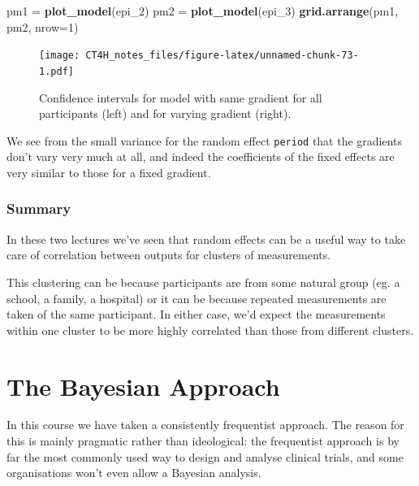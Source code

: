\documentclass[
  openany]{book}
\newenvironment{Shaded}{\begin{snugshade}}{\end{snugshade}}
\newcommand{\AttributeTok}[1]{\textcolor[rgb]{0.13,0.29,0.53}{#1}}
\newcommand{\DecValTok}[1]{\textcolor[rgb]{0.00,0.00,0.81}{#1}}
\newcommand{\FunctionTok}[1]{\textcolor[rgb]{0.13,0.29,0.53}{\textbf{#1}}}
\newcommand{\NormalTok}[1]{#1}
\newcommand{\OtherTok}[1]{\textcolor[rgb]{0.56,0.35,0.01}{#1}}
\theoremstyle{definition}
\theoremstyle{definition}
\theoremstyle{definition}
\theoremstyle{definition}
\theoremstyle{remark}
\begin{document}
\begin{Shaded}
\begin{Highlighting}[]
\NormalTok{pm1 }\OtherTok{=} \FunctionTok{plot\_model}\NormalTok{(epi\_2)}
\NormalTok{pm2 }\OtherTok{=} \FunctionTok{plot\_model}\NormalTok{(epi\_3)}
\FunctionTok{grid.arrange}\NormalTok{(pm1, pm2, }\AttributeTok{nrow=}\DecValTok{1}\NormalTok{)}
\end{Highlighting}
\end{Shaded}

\begin{figure}
\centering
\texttt{[image: CT4H\_notes\_files/figure-latex/unnamed-chunk-73-1.pdf]}
\caption{\label{fig:unnamed-chunk-73}Confidence intervals for model with same gradient for all participants (left) and for varying gradient (right).}
\end{figure}

We see from the small variance for the random effect \texttt{period} that the gradients don't vary very much at all, and indeed the coefficients of the fixed effects are very similar to those for a fixed gradient.

\hypertarget{summary}{%
\subsection*{Summary}\label{summary}}

In these two lectures we've seen that random effects can be a useful way to take care of correlation between outputs for clusters of measurements.

This clustering can be because participants are from some natural group (eg. a school, a family, a hospital) or it can be because repeated measurements are taken of the same participant. In either case, we'd expect the measurements within one cluster to be more highly correlated than those from different clusters.

\hypertarget{the-bayesian-approach}{%
\chapter{The Bayesian Approach}\label{the-bayesian-approach}}

In this course we have taken a consistently frequentist approach. The reason for this is mainly pragmatic rather than ideological: the frequentist approach is by far the most commonly used way to design and analyse clinical trials, and some organisations won't even allow a Bayesian analysis.
\end{document}
